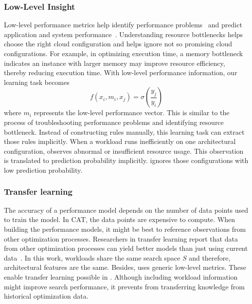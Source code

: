 \subsubsection*{Low-Level Insight}
Low-level performance metrics help identify
performance problems~\cite{Bodik2010, Novakovic2013} and
predict application and system performance~\cite{Hsu2016,Yadwadkar2017}.
Understanding resource bottlenecks helps choose the right cloud configuration and helps \scout ignore not so promising cloud configurations.
For example, in optimizing execution time, a memory bottleneck indicates
an instance with larger memory may improve resource efficiency,
thereby reducing execution time.
With low-level performance information, our learning task becomes
\begin{equation} \label{eq:3}
f(x_i, m_i, x_j) = \sigma({\frac{y_j}{y_i}})
\end{equation}
where $m_i$ represents the low-level performance vector.
This is similar to the process of
troubleshooting performance problems and
identifying resource bottleneck.
Instead of constructing rules manually,
this learning task can extract those rules implicitly.
When a workload runs inefficiently on one architectural configuration,
\scout observes abnormal or insufficient resource usage.
This observation is translated to prediction probability implicitly.
\scout ignores those configurations with low prediction probability.


\subsubsection*{Transfer learning}
The accuracy of a performance model depends on the number of data points
used to train the model.
In CAT, the data points are expensive to compute.
When building the performance models, it might be best to reference observations
from other optimization processes.
Researchers in transfer learning report that data
from other optimization processes can yield better models
than just using current data~\cite{pan2010survey,peters2015lace2}.
In this work, workloads share the same search space $S$ and therefore,
architectural features are the same.
Besides, \scout uses generic low-level metrics.
These enable transfer learning possible in \scout.
Although including workload information might improve search performance,
it prevents \scout from transferring knowledge
from historical optimization data.

